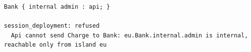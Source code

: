 \begin{lstlisting}[language={},basicstyle=\ttfamily\footnotesize,breaklines=true]
Bank { internal admin : api; }

session_deployment: refused
  Api cannot send Charge to Bank: eu.Bank.internal.admin is internal, reachable only from island eu
\end{lstlisting}
